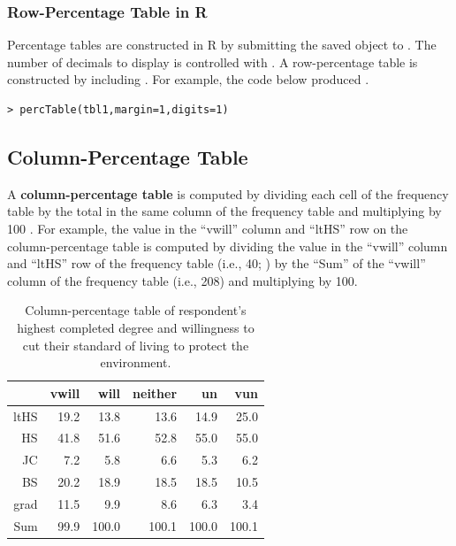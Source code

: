 \documentclass[10pt,openany]{book}\usepackage[]{graphicx}\usepackage[]{color}
\makeatletter
\newenvironment{kframe}{%
 \def\at@end@of@kframe{}%
 \ifinner\ifhmode%
  \def\at@end@of@kframe{\end{minipage}}%
  \begin{minipage}{\columnwidth}%
 \fi\fi%
 \def\FrameCommand##1{\hskip\@totalleftmargin \hskip-\fboxsep
 \colorbox{shadecolor}{##1}\hskip-\fboxsep
     \hskip-\linewidth \hskip-\@totalleftmargin \hskip\columnwidth}%
 \MakeFramed {\advance\hsize-\width
   \@totalleftmargin\z@ \linewidth\hsize
   \@setminipage}}%
 {\par\unskip\endMakeFramed%
 \at@end@of@kframe}
\newenvironment{knitrout}{}{} %
\makeatother
\begin{document}
\subsubsection*{Row-Percentage Table in R}
Percentage tables are constructed in R by submitting the saved  object to . The number of decimals to display is controlled with . A row-percentage table is constructed by including . For example, the code below produced .
\begin{knitrout}
\color{fgcolor}\begin{kframe}
\begin{verbatim}
> percTable(tbl1,margin=1,digits=1)
\end{verbatim}
\end{kframe}
\end{knitrout}

\subsection{Column-Percentage Table}
A \textbf{column-percentage table} is computed by dividing each cell of the frequency table by the total in the same column of the frequency table and multiplying by 100 . For example, the value in the ``vwill'' column and ``ltHS'' row on the column-percentage table is computed by dividing the value in the ``vwill'' column and ``ltHS'' row of the frequency table (i.e., 40; ) by the ``Sum'' of the ``vwill'' column of the frequency table (i.e., 208) and multiplying by 100.

\begin{table}[ht]
\centering
\caption{Column-percentage table of respondent's highest completed degree and willingness to cut their standard of living to protect the environment.} 
\label{tab:EnvColP}
\begin{tabular}{rrrrrr}
  \hline
 & vwill & will & neither & un & vun \\ 
  \hline
ltHS & 19.2 & 13.8 & 13.6 & 14.9 & 25.0 \\ 
  HS & 41.8 & 51.6 & 52.8 & 55.0 & 55.0 \\ 
  JC & 7.2 & 5.8 & 6.6 & 5.3 & 6.2 \\ 
  BS & 20.2 & 18.9 & 18.5 & 18.5 & 10.5 \\ 
  grad & 11.5 & 9.9 & 8.6 & 6.3 & 3.4 \\ 
  Sum & 99.9 & 100.0 & 100.1 & 100.0 & 100.1 \\ 
   \hline
\end{tabular}
\end{table}
\end{document}
